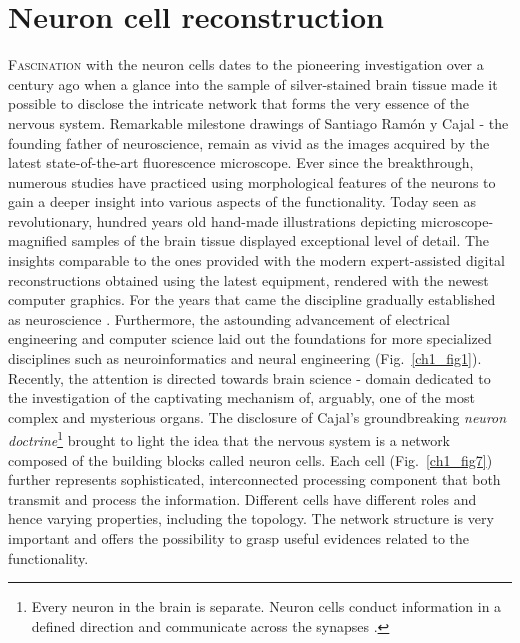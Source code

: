 \section{Neuron cell reconstruction} %
\lettrine{F}{ascination} with the neuron cells dates to the pioneering investigation over a century ago when a glance into the sample of silver-stained brain tissue made it possible to disclose the intricate network that forms the very essence of the nervous system. Remarkable milestone drawings of Santiago Ram\'{o}n y Cajal \cite{ramon2008histologia} - the founding father of neuroscience, remain as vivid as the images acquired by the latest state-of-the-art fluorescence microscope. Ever since the breakthrough, numerous studies \cite{ascoli2001computer,defelipe2013new,defelipe2002microstructure,defelipe1992pyramidal,van2001need,scorcioni2004quantitative,mason2007initiation,gensel2010semi,markram2015reconstruction} have practiced using morphological features of the neurons to gain a deeper insight into various aspects of the functionality. Today seen as revolutionary, hundred years old hand-made illustrations depicting microscope-magnified samples of the brain tissue \cite{swanson2017} displayed exceptional level of detail. The insights comparable to the ones provided with the modern expert-assisted digital reconstructions obtained using the latest equipment, rendered with the newest computer graphics. For the years that came the discipline gradually established as neuroscience \cite{kandel2000principles}. Furthermore, the astounding advancement of electrical engineering and computer science laid out the foundations for more specialized disciplines such as neuroinformatics and neural engineering (Fig.~\ref{ch1_fig1}). Recently, the attention is directed towards brain science - domain dedicated to the investigation of the captivating mechanism of, arguably, one of the most complex and mysterious organs. The disclosure of Cajal's groundbreaking \textit{neuron doctrine}\footnote{Every neuron in the brain is separate. Neuron cells conduct information in a defined direction and communicate across the synapses \cite{glickstein2006golgi}.} brought to light the idea that the nervous system is a network composed of the building blocks called neuron cells. Each cell (Fig.~\ref{ch1_fig7}) further represents sophisticated, interconnected processing component that both transmit and process the information. Different cells have different roles and hence varying properties, including the topology. The network structure is very important and offers the possibility to grasp useful evidences related to the functionality.

